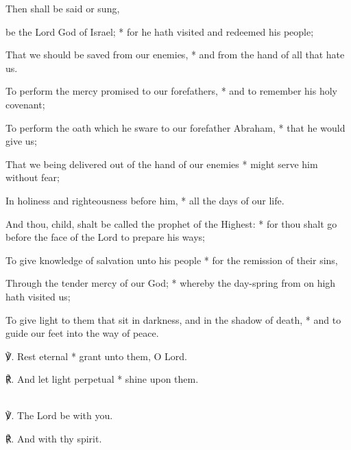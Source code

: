 \begin{rubric}
    Then shall be said or sung,
\end{rubric}\par\noindent
{}

 {} be the Lord God of Israel; * for he hath visited and redeemed his people;\par
    That we should be saved from our enemies, * and from the hand of all that hate us.\par
    To perform the mercy promised to our forefathers, * and to remember his holy covenant;\par
    To perform the oath which he sware to our forefather Abraham, * that he would give us;\par
    That we being delivered out of the hand of our enemies * might serve him without fear;\par
    In holiness and righteousness before him, * all the days of our life.\par
    And thou, child, shalt be called the prophet of the Highest: * for thou shalt go before the face of the Lord to prepare his ways;\par
    To give knowledge of salvation unto his people * for the remission of their sins,\par
    Through the tender mercy of our God; * whereby the day-spring from on high hath visited us;\par
    To give light to them that sit in darkness, and in the shadow of death, * and to guide our feet into the way of peace.

℣. Rest eternal * grant unto them, O Lord.\par
℟. And let light perpetual * shine upon them.

\\

℣. The Lord be with you.

℟. And with thy spirit.

